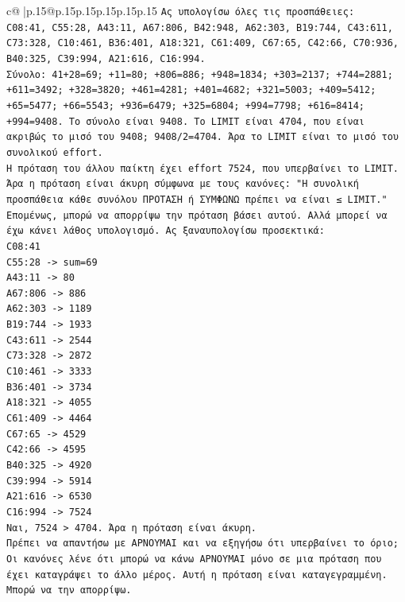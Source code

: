 \documentclass{article}
\begin{document}
{\begin{supertabular}{c@{$\;$}|p{.15\linewidth}@{}p{.15\linewidth}p{.15\linewidth}p{.15\linewidth}p{.15\linewidth}p{.15\linewidth}}
{{{\texttt{Ας υπολογίσω όλες τις προσπάθειες:} \\
\texttt{C08:41, C55:28, A43:11, A67:806, B42:948, A62:303, B19:744, C43:611, C73:328, C10:461, B36:401, A18:321, C61:409, C67:65, C42:66, C70:936, B40:325, C39:994, A21:616, C16:994.} \\
\texttt{Σύνολο: 41+28=69; +11=80; +806=886; +948=1834; +303=2137; +744=2881; +611=3492; +328=3820; +461=4281; +401=4682; +321=5003; +409=5412; +65=5477; +66=5543; +936=6479; +325=6804; +994=7798; +616=8414; +994=9408. Το σύνολο είναι 9408. Το LIMIT είναι 4704, που είναι ακριβώς το μισό του 9408; 9408/2=4704. Άρα το LIMIT είναι το μισό του συνολικού effort. } \\
\texttt{Η πρόταση του άλλου παίκτη έχει effort 7524, που υπερβαίνει το LIMIT. Άρα η πρόταση είναι άκυρη σύμφωνα με τους κανόνες: "Η συνολική προσπάθεια κάθε συνόλου ΠΡΟΤΑΣΗ ή ΣΥΜΦΩΝΩ πρέπει να είναι ≤ LIMIT." } \\
\texttt{Επομένως, μπορώ να απορρίψω την πρόταση βάσει αυτού. Αλλά μπορεί να έχω κάνει λάθος υπολογισμό. Ας ξαναυπολογίσω προσεκτικά:} \\
\texttt{C08:41} \\
\texttt{C55:28 {-}> sum=69} \\
\texttt{A43:11 {-}> 80} \\
\texttt{A67:806 {-}> 886} \\
\texttt{A62:303 {-}> 1189} \\
\texttt{B19:744 {-}> 1933} \\
\texttt{C43:611 {-}> 2544} \\
\texttt{C73:328 {-}> 2872} \\
\texttt{C10:461 {-}> 3333} \\
\texttt{B36:401 {-}> 3734} \\
\texttt{A18:321 {-}> 4055} \\
\texttt{C61:409 {-}> 4464} \\
\texttt{C67:65 {-}> 4529} \\
\texttt{C42:66 {-}> 4595} \\
\texttt{B40:325 {-}> 4920} \\
\texttt{C39:994 {-}> 5914} \\
\texttt{A21:616 {-}> 6530} \\
\texttt{C16:994 {-}> 7524} \\
\texttt{Ναι, 7524 > 4704. Άρα η πρόταση είναι άκυρη. } \\
\texttt{Πρέπει να απαντήσω με ΑΡΝΟΥΜΑΙ και να εξηγήσω ότι υπερβαίνει το όριο; Οι κανόνες λένε ότι μπορώ να κάνω ΑΡΝΟΥΜΑΙ μόνο σε μια πρόταση που έχει καταγράψει το άλλο μέρος. Αυτή η πρόταση είναι καταγεγραμμένη. Μπορώ να την απορρίψω. } \\
}}}
\end{supertabular}}
\end{document}

